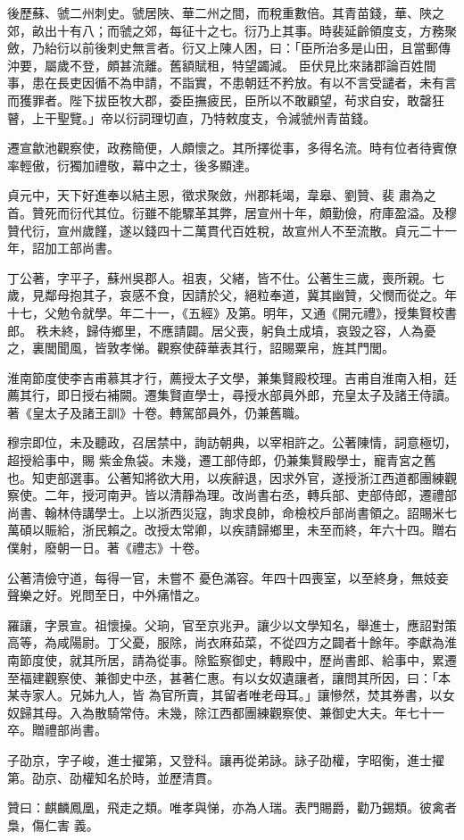 \begin{pinyinscope}
 後歷蘇、虢二州刺史。虢居陜、華二州之間，而稅重數倍。其青苗錢，華、陜之郊，畝出十有八；而虢之郊，每征十之七。衍乃上其事。時裴延齡領度支，方務聚斂，乃紿衍以前後刺史無言者。衍又上陳人困，曰：「臣所治多是山田，且當郵傳沖要，屬歲不登，頗甚流離。舊額賦租，特望蠲減。
 臣伏見比來諸郡論百姓間事，患在長吏因循不為申請，不詣實，不患朝廷不矜放。有以不言受譴者，未有言而獲罪者。陛下拔臣牧大郡，委臣撫疲民，臣所以不敢顧望，茍求自安，敢罄狂瞽，上干聖覽。」帝以衍詞理切直，乃特敕度支，令減虢州青苗錢。



 遷宣歙池觀察使，政務簡便，人頗懷之。其所擇從事，多得名流。時有位者待賓僚率輕傲，衍獨加禮敬，幕中之士，後多顯達。



 貞元中，天下好進奉以結主恩，徵求聚斂，州郡耗竭，韋皋、劉贊、裴
 肅為之首。贊死而衍代其位。衍雖不能驟革其弊，居宣州十年，頗勤儉，府庫盈溢。及穆贊代衍，宣州歲饉，遂以錢四十二萬貫代百姓稅，故宣州人不至流散。貞元二十一年，詔加工部尚書。



 丁公著，字平子，蘇州吳郡人。祖衷，父緒，皆不仕。公著生三歲，喪所親。七歲，見鄰母抱其子，哀感不食，因請於父，絕粒奉道，冀其幽贊，父憫而從之。年十七，父勉令就學。年二十一，《五經》及第。明年，又通《開元禮》，授集賢校書郎。
 秩未終，歸侍鄉里，不應請闢。居父喪，躬負土成墳，哀毀之容，人為憂之，裏閭聞風，皆敦孝悌。觀察使薛華表其行，詔賜粟帛，旌其門閭。



 淮南節度使李吉甫慕其才行，薦授太子文學，兼集賢殿校理。吉甫自淮南入相，廷薦其行，即日授右補闕。遷集賢直學士，尋授水部員外郎，充皇太子及諸王侍讀。著《皇太子及諸王訓》十卷。轉駕部員外，仍兼舊職。



 穆宗即位，未及聽政，召居禁中，詢訪朝典，以宰相許之。公著陳情，詞意極切，超授給事中，賜
 紫金魚袋。未幾，遷工部侍郎，仍兼集賢殿學士，寵青宮之舊也。知吏部選事。公著知將欲大用，以疾辭退，因求外官，遂授浙江西道都團練觀察使。二年，授河南尹。皆以清靜為理。改尚書右丞，轉兵部、吏部侍郎，遷禮部尚書、翰林侍講學士。上以浙西災寇，詢求良帥，命檢校戶部尚書領之。詔賜米七萬碩以賑給，浙民賴之。改授太常卿，以疾請歸鄉里，未至而終，年六十四。贈右僕射，廢朝一日。著《禮志》十卷。



 公著清儉守道，每得一官，未嘗不
 憂色滿容。年四十四喪室，以至終身，無妓妾聲樂之好。兇問至日，中外痛惜之。



 羅讓，字景宣。祖懷操。父珦，官至京兆尹。讓少以文學知名，舉進士，應詔對策高等，為咸陽尉。丁父憂，服除，尚衣麻茹菜，不從四方之闢者十餘年。李獻為淮南節度使，就其所居，請為從事。除監察御史，轉殿中，歷尚書郎、給事中，累遷至福建觀察使、兼御史中丞，甚著仁惠。有以女奴遺讓者，讓問其所因，曰：「本某寺家人。兄姊九人，皆
 為官所賣，其留者唯老母耳。」讓慘然，焚其券書，以女奴歸其母。入為散騎常侍。未幾，除江西都團練觀察使、兼御史大夫。年七十一卒。贈禮部尚書。



 子劭京，字子峻，進士擢第，又登科。讓再從弟詠。詠子劭權，字昭衡，進士擢第。劭京、劭權知名於時，並歷清貫。



 贊曰：麒麟鳳凰，飛走之類。唯孝與悌，亦為人瑞。表門賜爵，勸乃錫類。彼禽者梟，傷仁害
 義。



\end{pinyinscope}